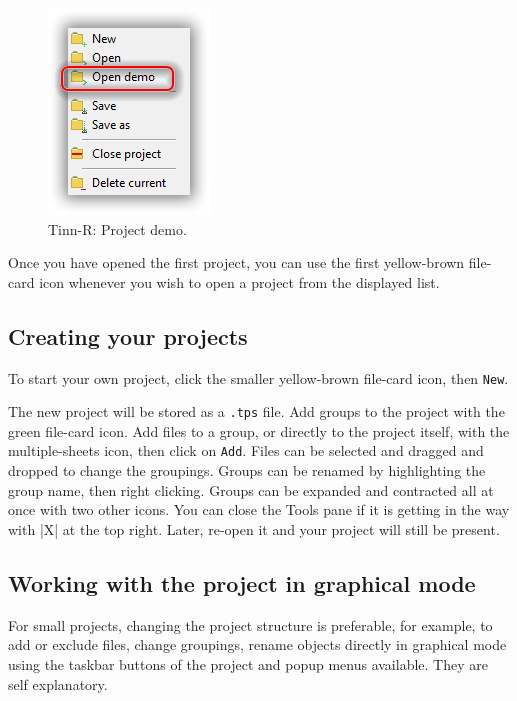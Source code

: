 \begin{figure}[H]
  \begin{center}
    \includegraphics[scale=0.60]{./res/projects_open_demo.png}
  \end{center}
  \caption{Tinn-R: Project demo.}
  \label{fig:tinn-r_projects_open_demo}
\end{figure}

Once you have opened the first project, you can use the first
yellow-brown file-card icon whenever you wish to open a project from the displayed list. 

\subsection{Creating your projects}
To start your own project, click the smaller yellow-brown file-card icon, then \texttt{New}.

The new project will be stored as a \texttt{.tps} file. Add groups to the project with the green file-card icon.
Add files to a group, or directly to the project itself, with the multiple-sheets icon, then click on \texttt{Add}. 
Files can be selected and dragged and dropped to change the groupings. Groups can be renamed by highlighting 
the group name, then right clicking. Groups can be expanded and contracted all at once with two other icons. 
You can close the Tools pane if it is getting in the way with |X| at the top right.  
Later, re-open it and your project will still be present.

\subsection{Working with the project in graphical mode}
For small projects, changing the project structure is preferable, for example, to add or exclude files, 
change groupings, rename objects directly in graphical mode using the taskbar buttons of the project
and popup menus available. They are self explanatory.

